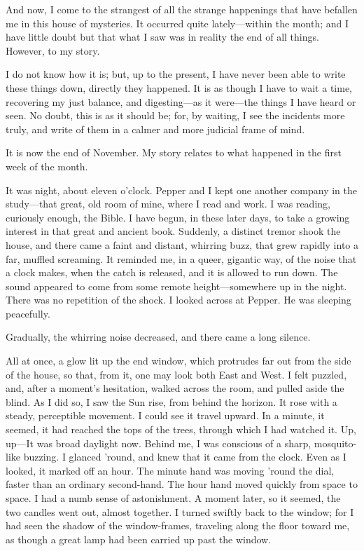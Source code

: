 
\clearpage
\label{ch:09}

\begin{ChapterStart}
\null\null
{}
\end{ChapterStart}

And now, I come to the strangest of all the strange happenings that have befallen me in this house of mysteries. It occurred quite lately---within the month; and I have little doubt but that what I saw was in reality the end of all things. However, to my story.

I do not know how it is; but, up to the present, I have never been able to write these things down, directly they happened. It is as though I have to wait a time, recovering my just balance, and digesting---as it were---the things I have heard or seen. No doubt, this is as it should be; for, by waiting, I see the incidents more truly, and write of them in a calmer and more judicial frame of mind.

It is now the end of November. My story relates to what happened in the first week of the month.

It was night, about eleven o’clock. Pepper and I kept one another company in the study---that great, old room of mine, where I read and work. I was reading, curiously enough, the Bible. I have begun, in these later days, to take a growing interest in that great and ancient book. Suddenly, a distinct tremor shook the house, and there came a faint and distant, whirring buzz, that grew rapidly into a far, muffled screaming. It reminded me, in a queer, gigantic way, of the noise that a clock makes, when the catch is released, and it is allowed to run down. The sound appeared to come from some remote height---somewhere up in the night. There was no repetition of the shock. I looked across at Pepper. He was sleeping peacefully.

Gradually, the whirring noise decreased, and there came a long silence.

All at once, a glow lit up the end window, which protrudes far out from the side of the house, so that, from it, one may look both East and West. I felt puzzled, and, after a moment’s hesitation, walked across the room, and pulled aside the blind. As I did so, I saw the Sun rise, from behind the horizon. It rose with a steady, perceptible movement. I could see it travel upward. In a minute, it seemed, it had reached the tops of the trees, through which I had watched it. Up, up---It was broad daylight now. Behind me, I was conscious of a sharp, mosquito-like buzzing. I glanced ’round, and knew that it came from the clock. Even as I looked, it marked off an hour. The minute hand was moving ’round the dial, faster than an ordinary second-hand. The hour hand moved quickly from space to space. I had a numb sense of astonishment. A moment later, so it seemed, the two candles went out, almost together. I turned swiftly back to the window; for I had seen the shadow of the window-frames, traveling along the floor toward me, as though a great lamp had been carried up past the window.

